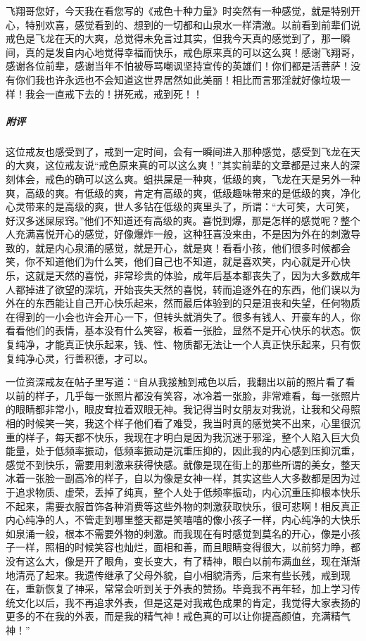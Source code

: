 \begin{case}
    飞翔哥您好，今天我在看您写的《戒色十种力量》时突然有一种感觉，就是特别开心，特别欢喜，感觉看到的、想到的一切都和山泉水一样清澈。以前看到前辈们说戒色是飞龙在天的大爽，总觉得未免言过其实，但我今天真的感觉到了，那一瞬间，真的是发自内心地觉得幸福而快乐，戒色原来真的可以这么爽！感谢飞翔哥，感谢各位前辈，感谢当年不怕被辱骂嘲讽坚持宣传的英雄们！你们都是活菩萨！没有你们我也许永远也不会知道这世界居然如此美丽！相比而言邪淫就好像垃圾一样！我会一直戒下去的！拼死戒，戒到死！！
    \subparagraph{附评} 这位戒友也感受到了，戒到一定时间，会有一瞬间进入那种感觉，感受到飞龙在天的大爽，这位戒友说“戒色原来真的可以这么爽！”其实前辈的文章都是过来人的深刻体会，戒色的确可以这么爽。蛆拱屎是一种爽，低级的爽，飞龙在天是另外一种爽，高级的爽。有低级的爽，肯定有高级的爽，低级趣味带来的是低级的爽，净化心灵带来的是高级的爽，世人多钻在低级的爽里头了，所谓：“大可笑，大可笑，好汉多迷屎尿窍。”他们不知道还有高级的爽。喜悦到爆，那是怎样的感觉呢？整个人充满喜悦开心的感觉，好像爆炸一般，这种狂喜没来由，不是因为外在的刺激导致的，就是内心泉涌的感觉，就是开心，就是爽！看看小孩，他们很多时候都会笑，你不知道他们为什么笑，他们自己也不知道，就是喜欢笑，内心就是开心快乐，这就是天然的喜悦，非常珍贵的体验，成年后基本都丧失了，因为大多数成年人都掉进了欲望的深坑，开始丧失天然的喜悦，转而追逐外在的东西，他们误以为外在的东西能让自己开心快乐起来，然而最后体验到的只是沮丧和失望，任何物质在得到的一小会也许会开心一下，但转头就消失了。很多有钱人、开豪车的人，你看看他们的表情，基本没有什么笑容，板着一张脸，显然不是开心快乐的状态。恢复纯净，才能真正快乐起来，钱、性、物质都无法让一个人真正快乐起来，只有恢复纯净心灵，行善积德，才可以。

    一位资深戒友在帖子里写道：“自从我接触到戒色以后，我翻出以前的照片看了看以前的样子，几乎每一张照片都没有笑容，冰冷着一张脸，非常难看，每一张照片的眼睛都非常小，眼皮耷拉着双眼无神。我记得当时女朋友对我说，让我和父母照相的时候笑一笑，我这个样子他们看了难受，我当时真的感觉笑不出来，心里很沉重的样子，每天都不快乐，我现在才明白是因为我沉迷于邪淫，整个人陷入巨大负能量，处于低频率振动，低频率振动是沉重压抑的，因此我的内心感到压抑沉重，感觉不到快乐，需要用刺激来获得快感。就像是现在街上的那些所谓的美女，整天冰着一张脸一副高冷的样子，自以为像是女神一样，其实这些人大多数都是因为过于追求物质、虚荣，丢掉了纯真，整个人处于低频率振动，内心沉重压抑根本快乐不起来，需要衣服首饰各种消费等这些外物的刺激获取快乐，很可悲啊！相反真正内心纯净的人，不管走到哪里整天都是笑嘻嘻的像小孩子一样，内心纯净的大快乐如泉涌一般，根本不需要外物的刺激。而我现在有时感觉到莫名的开心，像是小孩子一样，照相的时候笑容也灿烂，面相和善，而且眼睛变得很大，以前努力睁，都没有这么大，像是开了眼角，变长变大，有了精神，眼白以前布满血丝，现在渐渐地清亮了起来。我遗传继承了父母外貌，自小相貌清秀，后来有些长残，戒到现在，重新恢复了神采，常常会听到关于外表的赞扬。毕竟我不再年轻，加上学习传统文化以后，我不再追求外表，但是这是对我戒色成果的肯定，我觉得大家表扬的更多的不在我的外表，而是我的精气神！戒色真的可以让你提高颜值，充满精气神！”


\end{case}
